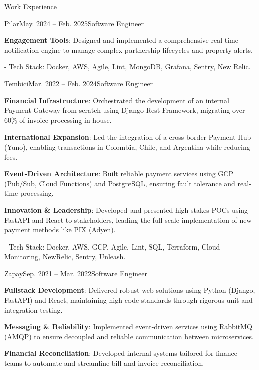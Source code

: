 \documentclass{resume} %
\begin{document}
\begin{rSection}{Work Experience}
\begin{rSubsection}{Pilar}{May. 2024 -- Feb. 2025}{Software Engineer}{}
\item \textbf{Engagement Tools}: Designed and implemented a comprehensive real-time notification engine to manage complex partnership lifecycles and 
property alerts.

- Tech Stack: Docker, AWS, Agile, Lint, MongoDB, Grafana, Sentry, New Relic.
\end{rSubsection}

\begin{rSubsection}{Tembici}{Mar. 2022 -- Feb. 2024}{Software Engineer}{}

\item \textbf{Financial Infrastructure}: Orchestrated the development of an internal Payment Gateway from scratch using Django Rest Framework, migrating over 60\% 
of invoice processing in-house.

\item \textbf{International Expansion}: Led the integration of a cross-border Payment Hub (Yuno), enabling transactions in Colombia, Chile, and Argentina 
while reducing fees.

\item \textbf{Event-Driven Architecture}: Built reliable payment services using GCP (Pub/Sub, Cloud Functions) and PostgreSQL, ensuring fault tolerance 
and real-time processing.

\item \textbf{Innovation \& Leadership}: Developed and presented high-stakes POCs using FastAPI and React to stakeholders, leading the 
full-scale implementation of new payment methods like PIX (Adyen).

- Tech Stack: Docker, AWS, GCP, Agile, Lint, SQL, Terraform, Cloud Monitoring, NewRelic, Sentry, Unleash.
\end{rSubsection}

\begin{rSubsection}{Zapay}{Sep. 2021 -- Mar. 2022}{Software Engineer}{}

\item \textbf{Fullstack Development}: Delivered robust web solutions using Python (Django, FastAPI) and React, maintaining high code standards 
through rigorous unit and integration testing.

\item \textbf{Messaging \& Reliability}: Implemented event-driven services using RabbitMQ (AMQP) to ensure decoupled and reliable communication between 
microservices.

\item \textbf{Financial Reconciliation}: Developed internal systems tailored for finance teams to automate and streamline bill and invoice reconciliation.


\end{rSubsection}
\end{rSection}
\end{document}
